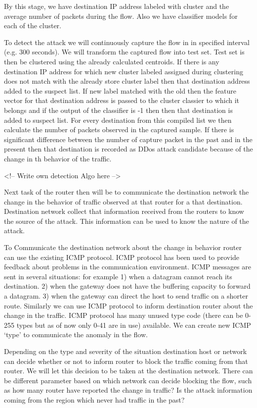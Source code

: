 \documentclass[10pt,oneside,a4paper]{article}
\begin{document}
By this stage, we have destination IP address labeled with cluster and the average number of packets during the flow. Also we have classifier models for each of the cluster.

To detect the attack we will continuously capture the flow in in specified interval (e.g. 300 seconds). We will transform the captured flow into test set. Test set is then be clustered using the already calculated centroids. If there is any destination IP address for which new cluster labeled assigned during clustering does not match with the already store cluster label then that destination address added to the suspect list. If new label matched with the old then the feature vector for that destination address is passed to the cluster classier to which it belongs and if the output of the classifier is -1 then then that destination is added to suspect list. For every destination from this compiled list we then calculate the number of packets observed in the captured sample. If there is significant difference between the number of capture packet in the past and in the present then that destination is recorded as DDos attack candidate because of the change in th behavior of the traffic.

<!-- Write own detection Algo here -->

Next task of the router then will be to communicate the destination network the change in the behavior of traffic observed at that router for a that destination. Destination network collect that information received from the routers to know the source of the attack. This information can be used to know the nature of the attack.

To Communicate the destination network about the change in behavior router can use the existing ICMP protocol. ICMP protocol has been used to provide feedback about problems in the communication environment. ICMP messages are sent in several situations:  for example 1) when a datagram cannot reach its destination. 2) when the gateway does not have the buffering capacity to forward a datagram. 3) when the gateway can direct the host to send traffic on a shorter route.\cite{icmp} Similarly we can use ICMP protocol to inform destination router about the change in the traffic. ICMP protocol has many unused type code (there can be 0-255 types but as of now only 0-41 are in use) available. We can create new ICMP `type' to communicate the anomaly in the flow.

Depending on the type and severity of the situation destination host or network can decide whether or not to inform router to block the traffic coming from that router. We will let this decision to be taken at the destination network. There can be different parameter based on which network can decide blocking the flow, such as how many router have reported the change in traffic? Is the attack information coming from the region which never had traffic in the past?
\end{document}
